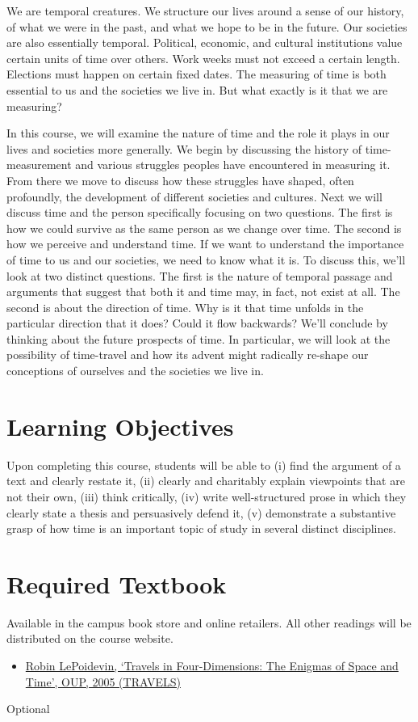 \documentclass[article,oneside]{memoir}
\begin{document}
We are temporal creatures. We structure our lives around a sense of our history, of what we were in the past, and what we hope to be in the future. Our societies are also essentially temporal. Political, economic, and cultural institutions value certain units of time over others. Work weeks must not exceed a certain length. Elections must happen on certain fixed dates. The measuring of time is both essential to us and the societies we live in. But what exactly is it that we are measuring?

  In this course, we will examine the nature of time and the role it plays in our lives and societies more generally. We begin by discussing the history of time-measurement and various struggles peoples have encountered in measuring it. From there we move to discuss how these struggles have shaped, often profoundly, the development of different societies and cultures. Next we will  discuss  time and the person specifically focusing on two questions. The first is how we could survive as the same person as we change over time. The second is how we perceive and understand time. If we want to understand the importance of time to us and our societies, we need to know what it is. To discuss this, we'll look at two distinct questions. The first is the nature of temporal passage and arguments that suggest that both it and time may, in fact, not exist at all.  The second is about the direction of time. Why is it that time unfolds in the particular direction that it does? Could it flow backwards? We'll conclude by thinking about the future prospects of time. In particular, we will look at the possibility of time-travel and how its advent might radically re-shape our conceptions of ourselves and the societies we live in. 



\section{Learning Objectives}

Upon completing this course, students will be able to (i) find the argument of a text and clearly restate it, (ii) clearly and charitably explain viewpoints that are not their own, (iii) think critically, (iv) write well-structured prose in which they clearly state a thesis and persuasively defend it, (v) demonstrate a substantive grasp of how time is an  important topic of study in several distinct disciplines. 


\section{Required Textbook}
Available in the campus book store and online retailers. All other readings will be distributed on the course website. 
\begin{itemize}
\item \href{http://www.amazon.com/Travels-Four-Dimensions-Enigmas-Space/dp/0198752555/ref=sr_1_1?ie=UTF8&qid=1452098846&sr=8-1&keywords=robin+le+poidevin+enigmas}{Robin LePoidevin, `Travels in Four-Dimensions: The Enigmas of Space and Time', OUP, 2005 (TRAVELS)}
\end{itemize}
Optional
\end{document}
